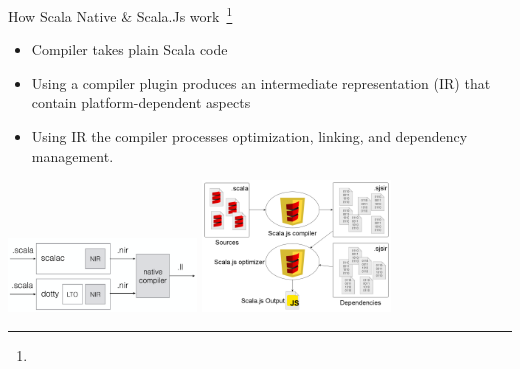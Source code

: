 \documentclass[presentation, 9pt]{beamer}\mode<presentation>{\usetheme{AMSBolognaFC}}
\begin{document}
\begin{frame}{How Scala Native \& Scala.Js work~\footnote{}}
\begin{itemize}
	\item Compiler takes plain Scala code
 	\item Using a compiler plugin produces an intermediate representation (IR) that contain platform-dependent aspects
  \item Using IR the compiler processes optimization, linking, and dependency management.
\end{itemize}
\vspace{0.5cm}
\hspace{0.5cm}
\includegraphics[width=5cm]{img/compilation.png}
\hspace{1cm}
\includegraphics[width=5cm]{img/compilation-pipeline.png}
\end{frame}
\end{document}
